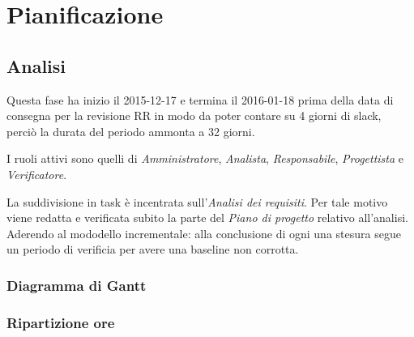 \section{Pianificazione}
\subsection{Analisi}
Questa fase ha inizio il 2015-12-17 e termina il 2016-01-18 prima della data di consegna per la revisione RR in modo da poter contare su 4 giorni di slack, perci\`o la durata del periodo ammonta a 32 giorni.

I ruoli attivi sono quelli di \textit{Amministratore}, \textit{Analista}, \textit{Responsabile}, \textit{Progettista} e \textit{Verificatore}.

La suddivisione in task \`e incentrata sull'\textit{Analisi dei requisiti}. Per tale motivo viene redatta e verificata subito la parte del \textit{Piano di progetto} relativo all'analisi. Aderendo al mododello incrementale: alla conclusione di ogni una stesura segue un periodo di verificia per avere una baseline non corrotta.
\subsubsection{Diagramma di Gantt}

\subsubsection{Ripartizione ore}

